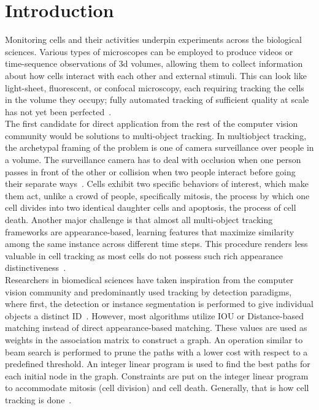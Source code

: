 \section{Introduction}
\label{sec:intro}


Monitoring cells and their activities underpin experiments across the biological sciences.  Various types of microscopes can be employed to produce videos or time-sequence observations of 3d volumes, allowing them to collect information about how cells interact with each other and external stimuli.  This can look like light-sheet, fluorescent, or confocal microscopy, each requiring tracking the cells in the volume they occupy; fully automated tracking of sufficient quality at scale has not yet been perfected~\cite{mavska2023cell}.\\

The first candidate for direct application from the rest of the computer vision community would be solutions to multi-object tracking.  In multiobject tracking, the archetypal framing of the problem is one of camera surveillance over people in a volume.  The surveillance camera has to deal with occlusion when one person passes in front of the other or collision when two people interact before going their separate ways~\cite{luo2021multiple}.  Cells exhibit two specific behaviors of interest, which make them act, unlike a crowd of people, specifically mitosis, the process by which one cell divides into two identical daughter cells and apoptosis, the process of cell death. Another major challenge is that almost all multi-object tracking frameworks are appearance-based, learning features that maximize similarity among the same instance across different time steps. This procedure renders less valuable in cell tracking as most cells do not possess such rich appearance distinctiveness~\cite{mavska2023cell}. \\

Researchers in biomedical sciences have taken inspiration from the computer vision community and predominantly used tracking by detection paradigms, where first, the detection or instance segmentation is performed to give individual objects a distinct ID~\cite{bragantini2024ultrack,ershov2022trackmate}. However, most algorithms utilize IOU or Distance-based matching instead of direct appearance-based matching. These values are used as weights in the association matrix to construct a graph. An operation similar to beam search is performed to prune the paths with a lower cost with respect to a predefined threshold.  An integer linear program is used to find the best paths for each initial node in the graph. Constraints are put on the integer linear program to accommodate mitosis (cell division) and cell death. Generally, that is how cell tracking is done~\cite{mavska2023cell}. \\

